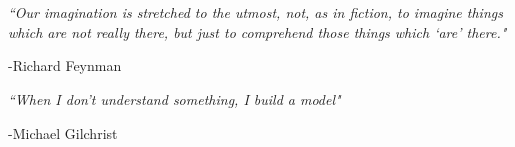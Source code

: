 \chapter*{}
\begin{center}
{\it ``Our imagination is stretched to the utmost, not, as in fiction, to imagine things which are not really there, but just to comprehend those things which `are' there."}
\end{center}
\begin{flushright}
-Richard Feynman
\end{flushright}

\begin{center}
{\it ``When I don't understand something, I build a model"}
\end{center}
\begin{flushright}
-Michael Gilchrist
\end{flushright}